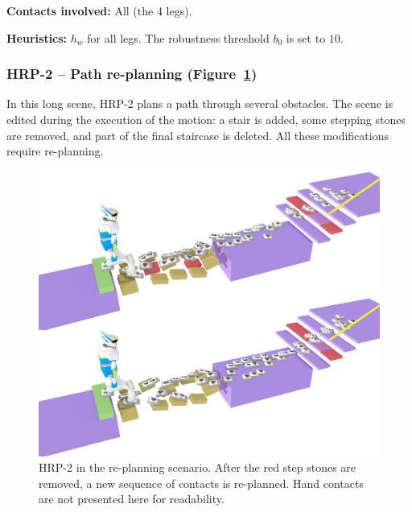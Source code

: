 \noindent\textbf{Contacts involved:} All (the 4 legs).

\noindent\textbf{Heuristics:} $h_w$ for all legs. The robustness threshold $b_0$ is set to $10$.


\subsubsection{HRP-2 -- Path re-planning (Figure~\ref{fig:re-planning})}
In this long scene, HRP-2 plans a path through several obstacles. The scene is edited during the execution of the motion: a stair is added,
some stepping stones are removed, and part of the final staircase is deleted. All these modifications require re-planning.


\begin{figure}
  \centering
  \includegraphics[width=0.7\linewidth]{figures/replanning}
  \caption{
           HRP-2 in the re-planning scenario. After the red step stones are removed, a new sequence of contacts is re-planned. Hand contacts
           are not presented here for readability.}
		   \label{fig:re-planning}
\end{figure}

